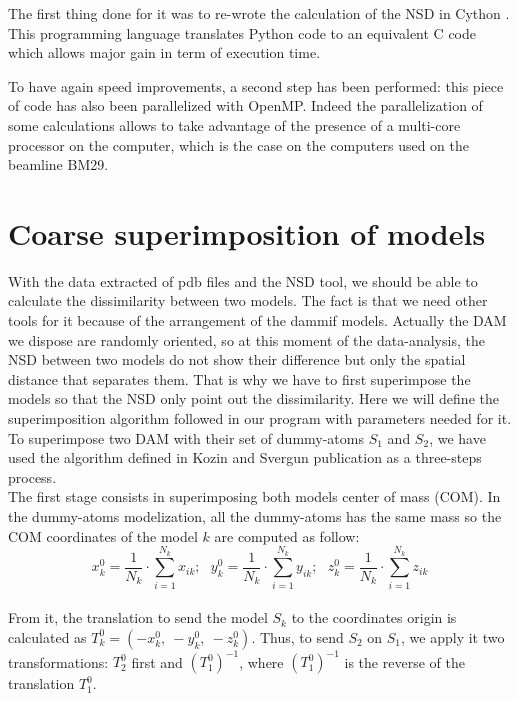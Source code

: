 \documentclass[a4paper, 11pt]{report}
\begin{document}
The first thing done for it was to re-wrote the calculation of the NSD 
in Cython \cite{cython}. 
This programming language translates Python code to an equivalent C 
code which allows major gain in term of execution time.

To have again speed improvements, a second step has been performed: 
this piece of code has also been parallelized with OpenMP. 
Indeed the parallelization of some calculations allows to take 
advantage of the presence of a multi-core processor on the computer, 
which is the case on the computers used on the beamline BM29.

\section{Coarse superimposition of models}

With the data extracted of pdb files and the NSD tool, we should be 
able to calculate the dissimilarity between two models. 
The fact is that we need other tools for it because of the arrangement 
of the dammif models. 
Actually the DAM we dispose are randomly oriented, so at this moment 
of the data-analysis, the NSD between two models do not show their 
difference but only the spatial distance that separates them. 
That is why we have to first superimpose the models so that the NSD 
only point out the dissimilarity. 
Here we will define the superimposition algorithm followed in our 
program with parameters needed for it.\\

To superimpose two DAM with their set of dummy-atoms $S_{1}$ and 
$S_{2}$, we have used the algorithm defined in Kozin and Svergun 
publication \cite{supcomb} as a three-steps process.\\

The first stage consists in superimposing both models center of mass 
(COM). 
In the dummy-atoms modelization, all the dummy-atoms has the same mass 
so the COM coordinates of the model $k$ are computed as follow:
\[
x_{k}^0 = \frac{1}{N_{k}} \cdot \sum\limits_{i=1}^{N_{k}} x_{ik};\ \ \ 
y_{k}^0 = \frac{1}{N_{k}} \cdot \sum\limits_{i=1}^{N_{k}} y_{ik};\ \ \ 
z_{k}^0 = \frac{1}{N_{k}} \cdot \sum\limits_{i=1}^{N_{k}} z_{ik}
\]\\
From it, the translation to send the model $S_{k}$ to the coordinates 
origin is calculated as $T_{k}^0 = (-x_{k}^0,\ -y_{k}^0,\ -z_{k}^0)$. 
Thus, to send $S_{2}$ on $S_{1}$, we apply it two transformations: 
$T_{2}^0$ first and $(T_{1}^0)^{-1}$, where $(T_{1}^0)^{-1}$ is the 
reverse of the translation $T_{1}^0$.\\
\end{document}
